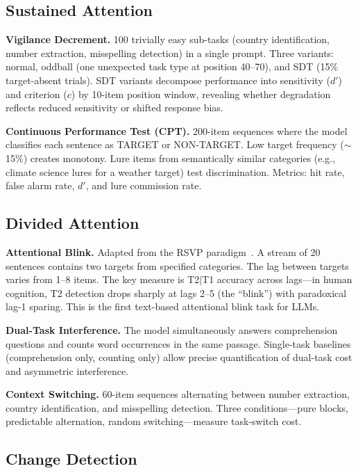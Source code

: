 \documentclass[11pt,twocolumn]{article}
\begin{document}
\subsection{Sustained Attention}

\textbf{Vigilance Decrement.} 100 trivially easy sub-tasks (country identification, number extraction, misspelling detection) in a single prompt. Three variants: normal, oddball (one unexpected task type at position 40--70), and SDT (15\% target-absent trials). SDT variants decompose performance into sensitivity ($d'$) and criterion ($c$) by 10-item position window, revealing whether degradation reflects reduced sensitivity or shifted response bias.

\textbf{Continuous Performance Test (CPT).} 200-item sequences where the model classifies each sentence as TARGET or NON-TARGET. Low target frequency ($\sim$15\%) creates monotony. Lure items from semantically similar categories (e.g., climate science lures for a weather target) test discrimination. Metrics: hit rate, false alarm rate, $d'$, and lure commission rate.

\subsection{Divided Attention}

\textbf{Attentional Blink.} Adapted from the RSVP paradigm~\citep{raymond1992}. A stream of 20 sentences contains two targets from specified categories. The lag between targets varies from 1--8 items. The key measure is T2$|$T1 accuracy across lags---in human cognition, T2 detection drops sharply at lags 2--5 (the ``blink'') with paradoxical lag-1 sparing. This is the first text-based attentional blink task for LLMs.

\textbf{Dual-Task Interference.} The model simultaneously answers comprehension questions and counts word occurrences in the same passage. Single-task baselines (comprehension only, counting only) allow precise quantification of dual-task cost and asymmetric interference.

\textbf{Context Switching.} 60-item sequences alternating between number extraction, country identification, and misspelling detection. Three conditions---pure blocks, predictable alternation, random switching---measure task-switch cost.

\subsection{Change Detection}
\end{document}
